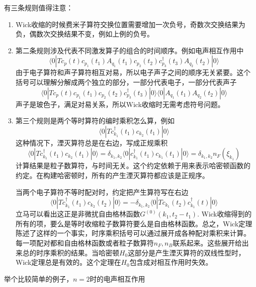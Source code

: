 \documentclass[a4paper,14pt]{article}
\begin{document}
有三条规则值得注意：
\begin{enumerate}
    \item Wick收缩的时候费米子算符交换位置需要增加一次负号，奇数次交换结果为负，偶数次交换结果不变，例如上例的负号。
    \item 第二条规则涉及代表不同激发算子的组合的时间顺序。例如电声相互作用中
    \begin{equation*}
        \langle0|Tc_p(t)c_{p_1}(t_1)A_{q_1}(t_1)c_{p_2}(t_2)c_{p_3}^\dagger(t_3)A_{q_2}(t_2)|0\rangle
    \end{equation*}
    由于电子算符和声子算符相互对易，所以电子声子之间的顺序无关紧要。这个括号可以理解分解成两个独立的部分，一部分代表电子，一部分代表声子
    \begin{equation*}
        \langle0|Tc_p(t)c_{p_1}(t_1)c_{p_2}(t_2)c_{p_3}^\dagger(t_3)|0\rangle\langle0|A_{q_1}(t_1)A_{q_2}(t_2)|0\rangle
    \end{equation*}
    声子是玻色子，满足对易关系，所以Wick收缩时无需考虑符号问题。
    \item 第三个规则是两个等时算符的编时乘积怎么算，例如
    \begin{equation*}
        \langle0|Tc_{k_1}^\dagger(t_1)c_{k_2}(t_1)|0\rangle
    \end{equation*}
    这种情况下，湮灭算符总是在右边，写成正规乘积
    \begin{equation*}
        \langle0|Tc_{k_1}^\dagger(t_1)c_{k_2}(t_1)|0\rangle=\delta_{k_1,k_2}\langle0|c_{k_1}^\dagger(t_1)c_{k_1}(t_1)|0\rangle=\delta_{k_1,k_2}n_F(\xi_{k_1})
    \end{equation*}
    计算结果是粒子数算符，与时间无关。这个约定依赖于用来表示哈密顿函数的约定。在构建哈密顿时，所有的产生湮灭算符都应该是正规序。

    当两个电子算符不等时配对时，约定把产生算符写在右边
    \begin{equation*}
        \langle0|Tc_{k_1}^\dagger(t_1)c_{k_2}(t_2)|0\rangle=-\delta_{k_1,k_2}\langle0|Tc_{k_1}(t_2)c_{k_1}^\dagger(t)|0\rangle
    \end{equation*}
    立马可以看出这正是非微扰自由格林函数$G^{(0)}(k_1,t_2-t_1)$. Wick收缩得到的所有的项，要么是等时收缩粒子数算符要么是自由格林函数。总之，Wick定理陈述了这样的一个事实，时序乘积括号可以通过展开成各种配对乘积来计算。每一项配对都和自由格林函数或者粒子数算符$n_F,n_B$联系起来。这些展开给出来总的时序乘积的结果。当哈密顿$H_0$这部分是产生湮灭算符的双线性型时，Wick定理总是有效的。这个定理在$H_0$包含成对相互作用时失效。
\end{enumerate}
举个比较简单的例子，$n=2$时的电声相互作用
\end{document}
